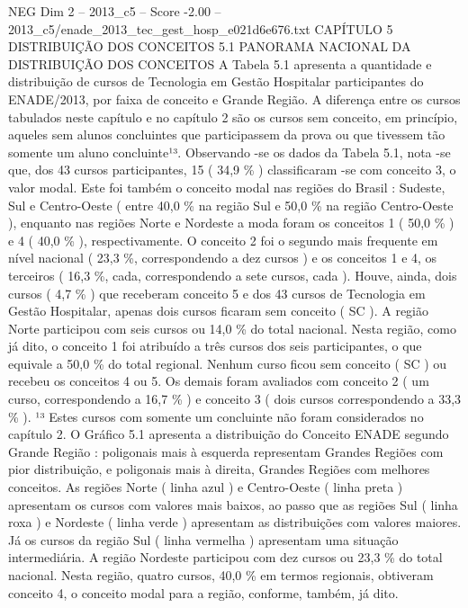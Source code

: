 \begin{textsample}{NEG Dim 2 – 2013\_c5 – Score -2.00 – 2013\_c5/enade\_2013\_tec\_gest\_hosp\_e021d6e676.txt}  \label{ex:f2_neg_069}
CAPÍTULO 5 DISTRIBUIÇÃO DOS CONCEITOS 5.1 PANORAMA NACIONAL DA DISTRIBUIÇÃO DOS CONCEITOS A Tabela 5.1 apresenta a quantidade e distribuição de cursos de Tecnologia em Gestão Hospitalar participantes do ENADE/2013, por faixa de conceito e Grande Região.
A diferença entre os cursos tabulados neste capítulo e no capítulo 2 são os cursos sem conceito, em princípio, aqueles sem alunos concluintes que participassem da prova ou que tivessem tão somente um aluno concluinte¹³.
Observando -se os dados da Tabela 5.1, nota -se que, dos 43 cursos participantes, 15 ( 34,9 \% ) classificaram -se com conceito 3, o valor modal.
Este foi também o conceito modal nas regiões do Brasil : Sudeste, Sul e Centro-Oeste ( entre 40,0 \% na região Sul e 50,0 \% na região Centro-Oeste ), enquanto nas regiões Norte e Nordeste a moda foram os conceitos 1 ( 50,0 \% ) e 4 ( 40,0 \% ), respectivamente.
O conceito 2 foi o segundo mais frequente em nível nacional ( 23,3 \%, correspondendo a dez cursos ) e os conceitos 1 e 4, os terceiros ( 16,3 \%, cada, correspondendo a sete cursos, cada ).
Houve, ainda, dois cursos ( 4,7 \% ) que receberam conceito 5 e dos 43 cursos de Tecnologia em Gestão Hospitalar, apenas dois cursos ficaram sem conceito ( SC ).
A região Norte participou com seis cursos ou 14,0 \% do total nacional.
Nesta região, como já dito, o conceito 1 foi atribuído a três cursos dos seis participantes, o que equivale a 50,0 \% do total regional.
Nenhum curso ficou sem conceito ( SC ) ou recebeu os conceitos 4 ou 5.
Os demais foram avaliados com conceito 2 ( um curso, correspondendo a 16,7 \% ) e conceito 3 ( dois cursos correspondendo a 33,3 \% ). ¹³ Estes cursos com somente um concluinte não foram considerados no capítulo 2.
O Gráfico 5.1 apresenta a distribuição do Conceito ENADE segundo Grande Região : poligonais mais à esquerda representam Grandes Regiões com pior distribuição, e poligonais mais à direita, Grandes Regiões com melhores conceitos.
As regiões Norte ( linha azul ) e Centro-Oeste ( linha preta ) apresentam os cursos com valores mais baixos, ao passo que as regiões Sul ( linha roxa ) e Nordeste ( linha verde ) apresentam as distribuições com valores maiores.
Já os cursos da região Sul ( linha vermelha ) apresentam uma situação intermediária.
A região Nordeste participou com dez cursos ou 23,3 \% do total nacional.
Nesta região, quatro cursos, 40,0 \% em termos regionais, obtiveram conceito 4, o conceito modal para a região, conforme, também, já dito.

\end{textsample}
